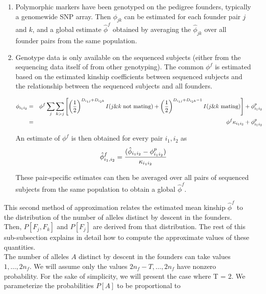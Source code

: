 \documentclass[12pt]{aastex}
\begin{document}
\begin{enumerate}
\item Polymorphic markers have been genotyped on the pedigree founders, typically a genomewide SNP array. Then $\phi_{jk}$ can be estimated for each founder pair $j$ and $k$, and a global estimate $\hat{\phi}^f$ obtained by averaging the $\hat{\phi}_{jk}$ over all founder pairs from the same population.
\item Genotype data is only available on the sequenced subjects (either from the sequencing data itself of from other genotyping). The common $\phi^f$ is estimated based on the estimated kinship coefficients between sequenced subjects and the relationship between the sequenced subjects and all founders. 

\begin{eqnarray}
\phi_{i_1i_2} &=& \phi^f \sum_j \sum_{k>j} \left[ \left( {1 \over 2} \right)^{D_{i_1j} + D_{i_2k}} I(j \& k \mbox{ not mating}) + \left( {1 \over 2} \right)^{D_{i_1j} + D_{i_2k} - 1} I(j \& k \mbox{ mating}) \right] + \phi_{i_1i_2}^p \nonumber \\
&=& \phi^f \kappa_{i_1i_2} + \phi_{i_1i_2}^p 
\end{eqnarray}
 
An estimate of $\phi^f$ is then obtained for every pair $i_1,i_2$ as
\begin{equation}
\hat{\phi}_{i_1,i_2}^f = { (\hat{\phi}_{i_1i_2} - \phi_{i_1i_2}^p)  \over \kappa_{i_1i_2} }
\end{equation}

These pair-specific estimates can then be averaged over all pairs of sequenced subjects from the same population to obtain a global $\hat{\phi}^f$. 
\end{enumerate}

This second method of approximation relates the estimated mean kinship $\hat{\phi}^f$ to the distribution of the number of alleles distinct by descent in the founders. Then, $P[F_j, F_k]$ and $P[F_j]$  are derived from that distribution. The rest of this sub-subsection explains in detail how to compute the approximate values of these quantities.\\

The number of alleles $A$ distinct by descent in the founders can take values $1, \dots, 2n_f$. We will assume only the values $2n_f-T, \dots, 2n_f$ have nonzero probability. For the sake of simplicity, we will present the case where T = 2. We parameterize the probabilities $P[A]$ to be proportional to
\end{document}
